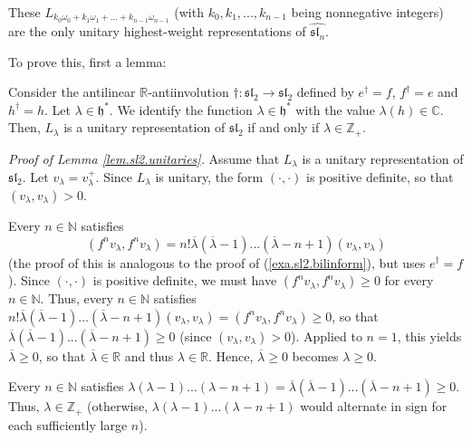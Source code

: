 \documentclass[etingof-lie.tex]{subfiles}
\begin{document}
\begin{theorem}
\label{thm.sln.unitaries}These $L_{k_{0}\omega_{0}+k_{1}\omega_{1}%
+...+k_{n-1}\omega_{n-1}}$ (with $k_{0},k_{1},...,k_{n-1}$ being nonnegative
integers) are the only unitary highest-weight representations of
$\widehat{\mathfrak{sl}_{n}}$.
\end{theorem}

To prove this, first a lemma:

\begin{lemma}
\label{lem.sl2.unitaries}Consider the antilinear $\mathbb{R}$-antiinvolution
$\dag:\mathfrak{sl}_{2}\rightarrow\mathfrak{sl}_{2}$ defined by $e^{\dag}=f$,
$f^{\dag}=e$ and $h^{\dag}=h$. Let $\lambda\in\mathfrak{h}^{\ast}$. We
identify the function $\lambda\in\mathfrak{h}^{\ast}$ with the value
$\lambda\left(  h\right)  \in\mathbb{C}$. Then, $L_{\lambda}$ is a unitary
representation of $\mathfrak{sl}_{2}$ if and only if $\lambda\in\mathbb{Z}%
_{+}$.
\end{lemma}

\textit{Proof of Lemma \ref{lem.sl2.unitaries}.} Assume that $L_{\lambda}$ is
a unitary representation of $\mathfrak{sl}_{2}$. Let $v_{\lambda}=v_{\lambda
}^{+}$. Since $L_{\lambda}$ is unitary, the form $\left(  \cdot,\cdot\right)
$ is positive definite, so that $\left(  v_{\lambda},v_{\lambda}\right)  >0$.

Every $n\in\mathbb{N}$ satisfies
\[
\left(  f^{n}v_{\lambda},f^{n}v_{\lambda}\right)  =n!\overline{\lambda}\left(
\overline{\lambda}-1\right)  ...\left(  \overline{\lambda}-n+1\right)  \left(
v_{\lambda},v_{\lambda}\right)
\]
(the proof of this is analogous to the proof of (\ref{exa.sl2.bilinform}), but
uses $e^{\dag}=f$). Since $\left(  \cdot,\cdot\right)  $ is positive definite,
we must have $\left(  f^{n}v_{\lambda},f^{n}v_{\lambda}\right)  \geq0$ for
every $n\in\mathbb{N}$. Thus, every $n\in\mathbb{N}$ satisfies $n!\overline
{\lambda}\left(  \overline{\lambda}-1\right)  ...\left(  \overline{\lambda
}-n+1\right)  \left(  v_{\lambda},v_{\lambda}\right)  =\left(  f^{n}%
v_{\lambda},f^{n}v_{\lambda}\right)  \geq0$, so that $\overline{\lambda
}\left(  \overline{\lambda}-1\right)  ...\left(  \overline{\lambda
}-n+1\right)  \geq0$ (since $\left(  v_{\lambda},v_{\lambda}\right)  >0$).
Applied to $n=1$, this yields $\overline{\lambda}\geq0$, so that
$\overline{\lambda}\in\mathbb{R}$ and thus $\lambda\in\mathbb{R}$. Hence,
$\overline{\lambda}\geq0$ becomes $\lambda\geq0$.

Every $n\in\mathbb{N}$ satisfies $\lambda\left(  \lambda-1\right)  ...\left(
\lambda-n+1\right)  =\overline{\lambda}\left(  \overline{\lambda}-1\right)
...\left(  \overline{\lambda}-n+1\right)  \geq0$. Thus, $\lambda\in
\mathbb{Z}_{+}$ (otherwise, $\lambda\left(  \lambda-1\right)  ...\left(
\lambda-n+1\right)  $ would alternate in sign for each sufficiently large $n$).
\end{document}
